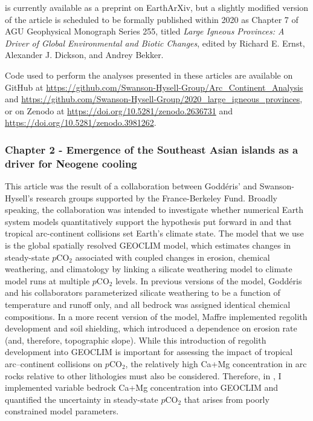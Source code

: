 \documentclass{ucbthesis}
\newcommand{\pCOtwo}{$p$CO$_{2}$\xspace}
\begin{document}
\begin{frontmatter}
\begin{preface}
\citet{Park2019a} is currently available as a preprint on EarthArXiv, but a slightly modified version of the article is scheduled to be formally published within 2020 as Chapter 7 of AGU Geophysical Monograph Series 255, titled \textit{Large Igneous Provinces: A Driver of Global Environmental and Biotic Changes}, edited by Richard E. Ernst, Alexander J. Dickson, and Andrey Bekker.

Code used to perform the analyses presented in these articles are available on GitHub at \url{https://github.com/Swanson-Hysell-Group/Arc_Continent_Analysis} and \url{https://github.com/Swanson-Hysell-Group/2020_large_igneous_provinces}, or on Zenodo at \url{https://doi.org/10.5281/zenodo.2636731} and \url{https://doi.org/10.5281/zenodo.3981262}.

\subsubsection*{Chapter 2 - Emergence of the Southeast Asian islands as a driver for Neogene cooling}

\noindent
{}

\bigskip

This article was the result of a collaboration between Godd\'eris' and Swanson-Hysell's research groups supported by the France-Berkeley Fund. Broadly speaking, the collaboration was intended to investigate whether numerical Earth system models quantitatively support the hypothesis put forward in \citet{Macdonald2019a} and \citet{Swanson-Hysell2017a} that tropical arc-continent collisions set Earth's climate state. The model that we use is the global spatially resolved GEOCLIM model, which estimates changes in steady-state \pCOtwo associated with coupled changes in erosion, chemical weathering, and climatology by linking a silicate weathering model to climate model runs at multiple \pCOtwo levels. In previous versions of the model, Godd\'eris and his collaborators parameterized silicate weathering to be a function of temperature and runoff only, and all bedrock was assigned identical chemical compositions. In a more recent version of the model, Maffre implemented regolith development and soil shielding, which introduced a dependence on erosion rate (and, therefore, topographic slope). While this introduction of regolith development into GEOCLIM is important for assessing the impact of tropical arc–continent collisions on \pCOtwo, the relatively high Ca+Mg concentration in arc rocks relative to other lithologies must also be considered. Therefore, in \citet{Park2020b}, I implemented variable bedrock Ca+Mg concentration into GEOCLIM and quantified the uncertainty in steady-state \pCOtwo that arises from poorly constrained model parameters.


\end{preface}
\end{frontmatter}
\end{document}
